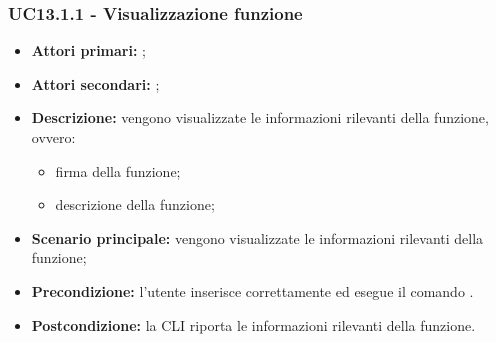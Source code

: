 \subsubsection{UC13.1.1 - Visualizzazione funzione }
\begin{itemize}
	\item \textbf{Attori primari:} \ua{};
	\item \textbf{Attori secondari:} \re{};
	\item \textbf{Descrizione:} vengono visualizzate le informazioni rilevanti della funzione, ovvero:
	\begin{itemize}
		\item firma della funzione;
		\item descrizione della funzione;
	\end{itemize}
	\item \textbf{Scenario principale:} vengono visualizzate le informazioni rilevanti della funzione;
	\item \textbf{Precondizione:} l'utente inserisce correttamente ed esegue il comando \lista{}.
	\item \textbf{Postcondizione:} la CLI riporta le informazioni rilevanti della funzione.  
\end{itemize}